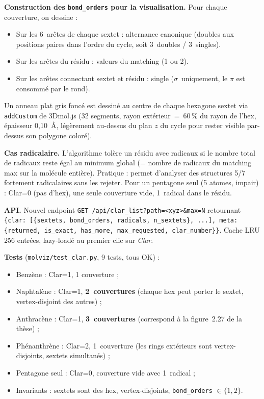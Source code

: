 \textbf{Construction des \texttt{bond\_orders} pour la visualisation.}
Pour chaque couverture, on dessine :
\begin{itemize}
  \item Sur les 6~arêtes de chaque sextet : alternance canonique
    (doubles aux positions paires dans l'ordre du cycle, soit 3~doubles
    / 3~singles).
  \item Sur les arêtes du résidu : valeurs du matching (1 ou 2).
  \item Sur les arêtes connectant sextet et résidu : single
    ($\sigma$~uniquement, le $\pi$ est \og{}consommé\fg{} par le rond).
\end{itemize}
Un anneau plat gris foncé est dessiné au centre de chaque hexagone
sextet via \texttt{addCustom} de 3Dmol.js (32 segments, rayon
extérieur~=~60\,\% du rayon de l'hex, épaisseur 0{,}10~\AA, légèrement
au-dessus du plan $z$ du cycle pour rester visible par-dessus son
polygone coloré).

\textbf{Cas radicalaire.} L'algorithme tolère un résidu avec radicaux
si le nombre total de radicaux reste égal au minimum global (= nombre
de radicaux du matching max sur la molécule entière). Pratique : permet
d'analyser des structures 5/7 fortement radicalaires sans les rejeter.
Pour un pentagone seul (5 atomes, impair) : Clar=0 (pas d'hex), une
seule couverture vide, 1~radical dans le résidu.

\textbf{API.} Nouvel endpoint
\texttt{GET /api/clar\_list?path=<xyz>\&max=N} retournant
\texttt{\{clar: [\{sextets, bond\_orders, radicals, n\_sextets\}, ...],
meta: \{returned, is\_exact, has\_more, max\_requested, clar\_number\}\}}.
Cache LRU 256 entrées, lazy-loadé au premier clic sur \emph{Clar}.

\textbf{Tests} (\texttt{molviz/test\_clar.py}, 9 tests, tous OK) :
\begin{itemize}
  \item Benzène : Clar=1, 1 couverture ;
  \item Naphtalène : Clar=1, \textbf{2~couvertures} (chaque hex peut
    porter le sextet, vertex-disjoint des autres) ;
  \item Anthracène : Clar=1, \textbf{3~couvertures} (correspond à la
    figure~2.27 de la thèse) ;
  \item Phénanthrène : Clar=2, 1~couverture (les rings extérieurs sont
    vertex-disjoints, sextets simultanés) ;
  \item Pentagone seul : Clar=0, couverture vide avec 1~radical ;
  \item Invariants : sextets sont des hex, vertex-disjoints,
    \texttt{bond\_orders} $\in \{1,2\}$.
\end{itemize}

